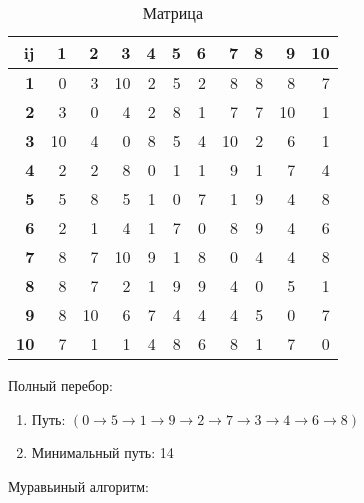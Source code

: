 \documentclass[a4paper,12pt]{article}
\begin{document}
\begin{table} [h!]
	\begin{center}
		\caption{Матрица}
		\begin{tabular}{|r|r|r|r|r|r|r|r|r|r|r|}
			\hline
			{\bf ij} &    {\bf 1} &    {\bf 2} &    {\bf 3} &    {\bf 4} &    {\bf 5} &    {\bf 6} &    {\bf 7} &    {\bf 8} &    {\bf 9} &   {\bf 10} \\
			\hline
			{\bf 1}& 0 & 3 & 10 & 2 & 5 & 2 & 8 & 8 & 8 & 7\\
			\hline
			{\bf 2}& 3 & 0 & 4 & 2 & 8 & 1 & 7 & 7 & 10 & 1\\
			\hline
			{\bf 3}& 10 & 4 & 0 & 8 & 5 & 4 & 10 & 2 & 6 & 1\\
			\hline
			{\bf 4}& 2 & 2 & 8 & 0 & 1 & 1 & 9 & 1 & 7 & 4\\
			\hline
			{\bf 5}& 5 & 8 & 5 & 1 & 0 & 7 & 1 & 9 & 4 & 8\\
			\hline
			{\bf 6}& 2 & 1 & 4 & 1 & 7 & 0 & 8 & 9 & 4 & 6\\
			\hline
			{\bf 7}& 8 & 7 & 10 & 9 & 1 & 8 & 0 & 4 & 4 & 8\\
			\hline
			{\bf 8}& 8 & 7 & 2 & 1 & 9 & 9 & 4 & 0 & 5 & 1\\
			\hline
			{\bf 9}& 8 & 10 & 6 & 7 & 4 & 4 & 4 & 5 & 0 & 7\\
			\hline
			{\bf 10}& 7 & 1 & 1 & 4 & 8 & 6 & 8 & 1 & 7 & 0\\
			\hline
		\end{tabular}  
		\label{m1}
	\end{center}
\end{table}

Полный перебор:
\begin{enumerate}
	\item Путь: $( 0 \rightarrow 5 \rightarrow 1 \rightarrow 9 \rightarrow 2 \rightarrow 7 \rightarrow 3 \rightarrow 4 \rightarrow 6 \rightarrow 8 )$
	\item Минимальный путь: 14
\end{enumerate}


Муравьиный алгоритм:
\end{document}
